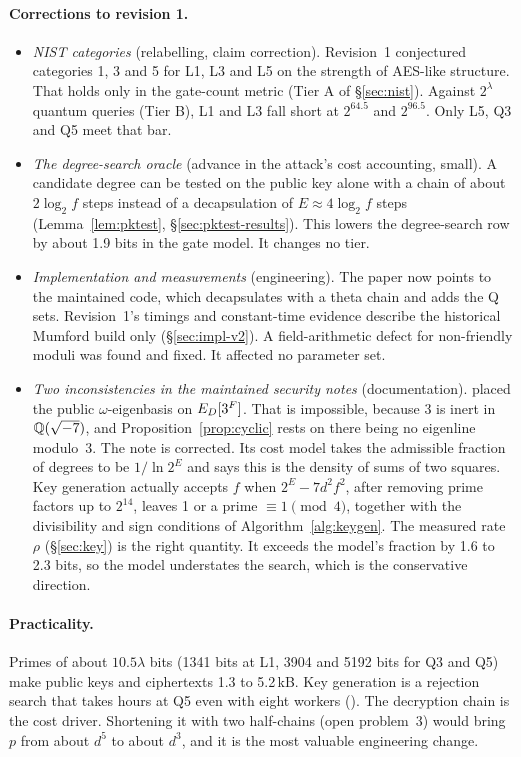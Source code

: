 \paragraph{Corrections to revision 1.}
\begin{itemize}
\item \emph{NIST categories} (relabelling, claim correction). Revision~1
  conjectured categories 1, 3 and 5 for L1, L3 and L5 on the strength of
  AES-like structure. That holds only in the gate-count metric (Tier A of
  \S\ref{sec:nist}). Against $2^\lambda$ quantum queries (Tier B), L1 and L3
  fall short at $2^{64.5}$ and $2^{96.5}$. Only L5, Q3 and Q5 meet that bar.
\item \emph{The degree-search oracle} (advance in the attack's cost
  accounting, small). A candidate degree can be tested on the public key
  alone with a chain of about $2\log_2f$ steps instead of a decapsulation
  of $E\approx4\log_2f$ steps (Lemma~\ref{lem:pktest},
  \S\ref{sec:pktest-results}). This lowers the degree-search row by about
  1.9 bits in the gate model. It changes no tier.
\item \emph{Implementation and measurements} (engineering). The paper now
  points to the maintained code, which decapsulates with a theta chain and
  adds the Q sets. Revision~1's timings and constant-time evidence describe
  the historical Mumford build only (\S\ref{sec:impl-v2}). A field-arithmetic
  defect for non-friendly moduli was found and fixed. It affected no
  parameter set.
\item \emph{Two inconsistencies in the maintained security notes}
  (documentation).  placed the public
  $\omega$-eigenbasis on $E_D[3^F]$. That is impossible, because $3$ is inert
  in $\mathbb{Q}(\sqrt{-7})$, and Proposition~\ref{prop:cyclic} rests on there being
  no eigenline modulo~3. The note is corrected. Its cost model takes the
  admissible fraction of degrees to be $1/\ln2^E$ and says this is the
  density of sums of two squares. Key generation actually accepts $f$ when
  $2^E-7d^2f^2$, after removing prime factors up to $2^{14}$, leaves 1 or a
  prime $\equiv1\pmod4$, together with the divisibility and sign conditions of Algorithm~\ref{alg:keygen}. The measured rate $\rho$
  (\S\ref{sec:key}) is the right quantity. It exceeds the model's fraction
  by 1.6 to 2.3 bits, so the model understates the search, which is the
  conservative direction.
\end{itemize}

\paragraph{Practicality.} Primes of about $10.5\lambda$ bits (1341 bits at
L1, 3904 and 5192 bits for Q3 and Q5) make public keys and ciphertexts 1.3 to
5.2\,kB. Key generation is a rejection search that takes hours at Q5 even
with eight workers (). The decryption
chain is the cost driver. Shortening it with two half-chains (open
problem~3) would bring $p$ from about $d^5$ to about $d^3$, and it is the
most valuable engineering change.
